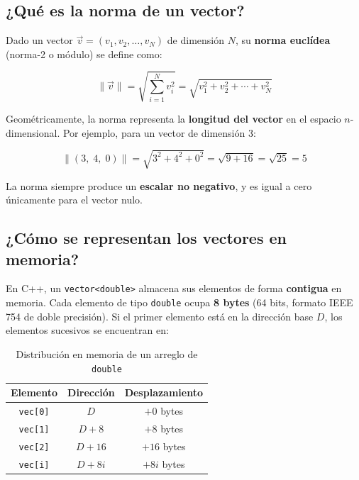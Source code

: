 \documentclass[12pt, letterpaper]{article}
\begin{document}
\subsection*{¿Qué es la norma de un vector?}

Dado un vector $\vec{v} = (v_1, v_2, \ldots, v_N)$ de dimensión $N$, su \textbf{norma euclídea} (norma-2 o módulo) se define como:

\begin{equation}
    \|\vec{v}\| = \sqrt{\sum_{i=1}^{N} v_i^2} = \sqrt{v_1^2 + v_2^2 + \cdots + v_N^2}
\end{equation}

Geométricamente, la norma representa la \textbf{longitud del vector} en el espacio $n$-dimensional. Por ejemplo, para un vector de dimensión 3:

\begin{equation}
    \|(3,\; 4,\; 0)\| = \sqrt{3^2 + 4^2 + 0^2} = \sqrt{9 + 16} = \sqrt{25} = 5
\end{equation}

La norma siempre produce un \textbf{escalar no negativo}, y es igual a cero únicamente para el vector nulo.

\subsection*{¿Cómo se representan los vectores en memoria?}

En C++, un \texttt{vector<double>} almacena sus elementos de forma \textbf{contigua} en memoria. Cada elemento de tipo \texttt{double} ocupa \textbf{8 bytes} (64 bits, formato IEEE 754 de doble precisión). Si el primer elemento está en la dirección base $D$, los elementos sucesivos se encuentran en:

\begin{table}[H]
    \centering
    \begin{tabular}{@{}ccc@{}}
        \toprule
        \textbf{Elemento} & \textbf{Dirección} & \textbf{Desplazamiento} \\
        \midrule
        \texttt{vec[0]} & $D$       & $+0$ bytes \\
        \texttt{vec[1]} & $D + 8$   & $+8$ bytes \\
        \texttt{vec[2]} & $D + 16$  & $+16$ bytes \\
        \texttt{vec[i]} & $D + 8i$  & $+8i$ bytes \\
        \bottomrule
    \end{tabular}
    \caption{Distribución en memoria de un arreglo de \texttt{double}}
\end{table}
\end{document}
